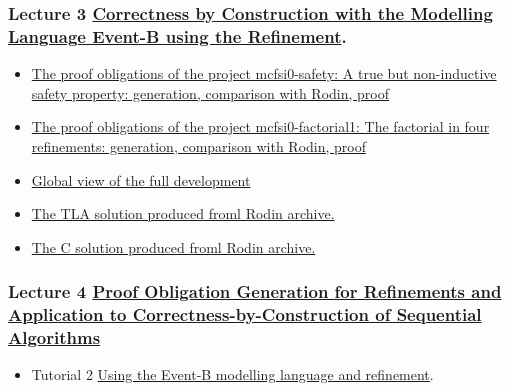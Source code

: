 \documentclass[ 12pt]{article}
\begin{document}
  \subsubsection{Lecture 3
    \href{http://mery54.github.io/teaching/mosos/lecturesnotes/mcfsi-lect2.pdf}{Correctness by Construction with the  
      Modelling Language Event-B using the Refinement}.}
\label{sec:lect-3-hrefhttp:m}


\begin{itemize}
\item
  \href{http://mery54.github.io/teaching/mosos/lecturesnotes/mcfsi0-safety-po-slides-en.pdf}{The
    proof obligations of the project mcfsi0-safety: A true but
    non-inductive safety property: generation, comparison with Rodin,
   proof}
  \item
  \href{http://mery54.github.io/teaching/mosos/lecturesnotes/mcfsi0-factorial1-po-slides-en.pdf}{The
    proof obligations of the project mcfsi0-factorial1: The factorial
    in four refinements: generation, comparison with Rodin, proof} 
\item
  \href{http://mery54.github.io/teaching/mosos/lecturesnotes/mcfsi0_factorial1_diagram.pdf}{Global
    view of the full development}
\item 
  \href{http://mery54.github.io/teaching/mosos/models/mcfsi0_factorial1.zip}{The 
    TLA solution produced froml Rodin archive.}
  \item 
  \href{http://mery54.github.io/teaching/mosos/models/mcfsi0_factorial1-c.zip}{The 
    C  solution produced froml Rodin archive.}
  
\end{itemize}




  \subsubsection{Lecture 4
    \href{http://mery54.github.io/teaching/mosos/lecturesnotes/mcfsi-po2.pdf}{Proof Obligation Generation  for Refinements
  and Application to Correctness-by-Construction of Sequential Algorithms}}



\begin{itemize}
\item   Tutorial 2     \href{http://mery54.github.io/teaching/mosos/lecturesnotes/mcfsi-td3.pdf}{Using
      the Event-B modelling language and refinement}.


\end{itemize}
\end{document}
